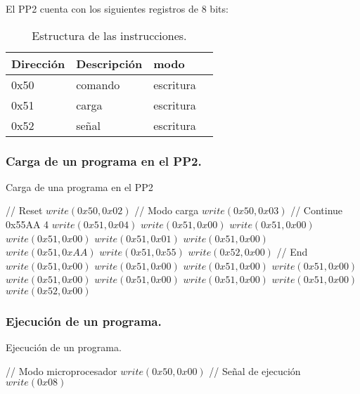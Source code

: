 El PP2 cuenta con los siguientes registros de 8 bits:

\begin{table}[ht]
    \centering
    \begin{tabular}{|l|l|l|l|}
    \hline
    Direcci\'on  & Descripci\'on & modo  \\
    \hline
    0x50 & comando & escritura\\
    \hline
    0x51 & carga   & escritura\\
    \hline
    0x52 & se\~nal   & escritura \\
    \hline
\end{tabular}
\caption{\label{tab:pp2_reg}Estructura de las instrucciones.}
\end{table}
\newpage
\subsubsection{Carga de un programa en el PP2.}
\begin{algorithm}
    \caption{Carga de una programa en el PP2}\label{algo_pp2_load}
    \begin{algorithmic}[1]
    \State // {Reset}
    \State $write(0x50, 0x02)$
    \State // {Modo carga}
    \State $write(0x50, 0x03)$
    \State // {Continue 0x55AA 4}
    \State $write(0x51, 0x04)$
    \State $write(0x51,0x00)$
    \State $write(0x51,0x00)$
    \State $write(0x51,0x00)$
    \State $write(0x51,0x01)$
    \State $write(0x51,0x00)$
    \State $write(0x51,0xAA)$
    \State $write(0x51,0x55)$
    \State $write(0x52, 0x00)$
    \State // {End}
    \State $write(0x51,0x00)$
    \State $write(0x51,0x00)$
    \State $write(0x51,0x00)$
    \State $write(0x51,0x00)$
    \State $write(0x51,0x00)$
    \State $write(0x51,0x00)$
    \State $write(0x51,0x00)$
    \State $write(0x51,0x00)$
    \State $write(0x52,0x00)$
    \EndProcedure
    \end{algorithmic}
    \end{algorithm}

\subsubsection{Ejecuci\'on de un programa.}
\begin{algorithm}
    \caption{Ejecuci\'on de un programa.}\label{algo_pp2_exe}
    \begin{algorithmic}[1]
    \State // {Modo microprocesador}
    \State $write(0x50, 0x00)$
    \State // {Señal de ejecuci\'on}
    \State $write(0x08)$
    \EndProcedure
    \end{algorithmic}
    \end{algorithm}
\newpage
